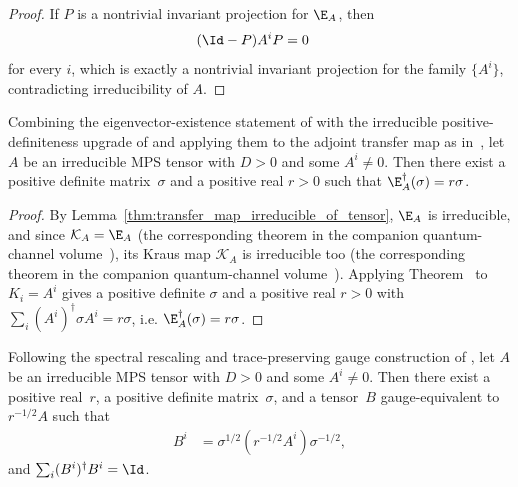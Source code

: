 \begin{proof}\leanok
    If $P$ is a nontrivial invariant projection for $\E_A$, then
    \begin{align}
        (\Id-P)A^iP
         & = 0
        \notag
    \end{align}
    for every $i$, which is exactly a nontrivial invariant projection for
    the family $\{A^i\}$, contradicting irreducibility of $A$.
\end{proof}

\begin{lemma}%
    \label{thm:posDef_adjoint_eigenvector}
    \leanok
    Combining the eigenvector-existence statement of
    \cite[Theorem~6.5]{Wolf2012Quantum} with the irreducible positive-definiteness
    upgrade of \cite[Theorem~6.3(2)--(3)]{Wolf2012Quantum} and applying them to
    the adjoint transfer map as in~\cite[Appendix~A]{Cirac2016MPDO_arXiv}, let
    $A$ be an irreducible MPS tensor with $D > 0$ and some $A^i \neq 0$.
    Then there exist a positive definite matrix~$\sigma$
    and a positive real $r > 0$ such that
    $\E_A^\dagger(\sigma) = r\sigma$.
\end{lemma}

\begin{proof}\leanok
    By Lemma~\ref{thm:transfer_map_irreducible_of_tensor}, $\E_A$ is
    irreducible, and since $\mathcal K_A = \E_A$
    (the corresponding theorem in the companion quantum-channel volume~\cite[``Kraus-map form of the transfer map'']{QICLean2026Blueprint}), its Kraus map $\mathcal K_A$ is
    irreducible too (the corresponding theorem in the companion quantum-channel volume~\cite[``Irreducibility in Kraus-map notation'']{QICLean2026Blueprint}). Applying
    Theorem~\cite[``Positive-definite adjoint eigenvector for irreducible Kraus families'']{QICLean2026Blueprint} to $K_i = A^i$ gives
    a positive definite $\sigma$ and a positive real $r > 0$ with
    $\sum_i (A^i)^\dagger \sigma A^i = r\sigma$, i.e.
    $\E_A^\dagger(\sigma) = r\sigma$.
\end{proof}

\begin{lemma}%
    \label{thm:tp_data_irreducible}
    \leanok
    Following the spectral rescaling and trace-preserving gauge construction of
    \cite[Appendix~A]{Cirac2016MPDO_arXiv}, let $A$ be an irreducible MPS tensor
    with $D > 0$ and some $A^i \neq 0$.
    Then there exist a positive real~$r$, a positive definite matrix~$\sigma$,
    and a tensor~$B$ gauge-equivalent to $r^{-1/2}A$ such that
    \begin{align}
        B^i
         & = \sigma^{1/2}(r^{-1/2}A^i)\sigma^{-1/2},
        \label{eq:qpf_irred_tp_gauge}
    \end{align}
    and $\sum_i (B^i)^\dagger B^i = \Id$.
\end{lemma}

